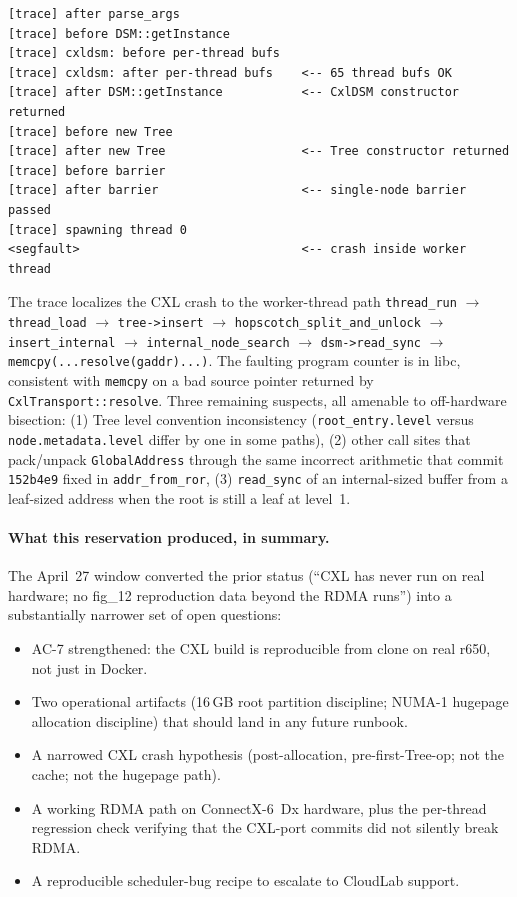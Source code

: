 \documentclass[11pt,a4paper]{article}
\begin{document}
\begin{lstlisting}[basicstyle=\ttfamily\scriptsize]
[trace] after parse_args
[trace] before DSM::getInstance
[trace] cxldsm: before per-thread bufs
[trace] cxldsm: after per-thread bufs    <-- 65 thread bufs OK
[trace] after DSM::getInstance           <-- CxlDSM constructor returned
[trace] before new Tree
[trace] after new Tree                   <-- Tree constructor returned
[trace] before barrier
[trace] after barrier                    <-- single-node barrier passed
[trace] spawning thread 0
<segfault>                               <-- crash inside worker thread
\end{lstlisting}

The trace localizes the CXL crash to the worker-thread path \texttt{thread\_run} $\to$ \texttt{thread\_load} $\to$ \texttt{tree->insert} $\to$ \texttt{hopscotch\_split\_and\_unlock} $\to$ \texttt{insert\_internal} $\to$ \texttt{internal\_node\_search} $\to$ \texttt{dsm->read\_sync} $\to$ \texttt{memcpy(...resolve(gaddr)...)}. The faulting program counter is in libc, consistent with \texttt{memcpy} on a bad source pointer returned by \texttt{CxlTransport::resolve}. Three remaining suspects, all amenable to off-hardware bisection: (1) Tree level convention inconsistency (\texttt{root\_entry.level} versus \texttt{node.metadata.level} differ by one in some paths), (2) other call sites that pack/unpack \texttt{GlobalAddress} through the same incorrect arithmetic that commit \texttt{152b4e9} fixed in \texttt{addr\_from\_ror}, (3) \texttt{read\_sync} of an internal-sized buffer from a leaf-sized address when the root is still a leaf at level~1.

\paragraph{What this reservation produced, in summary.} The April~27 window converted the prior status (``CXL has never run on real hardware; no fig\_12 reproduction data beyond the RDMA runs'') into a substantially narrower set of open questions:

\begin{itemize}[nosep]
    \item AC-7 strengthened: the CXL build is reproducible from clone on real r650, not just in Docker.
    \item Two operational artifacts (16\,GB root partition discipline; NUMA-1 hugepage allocation discipline) that should land in any future runbook.
    \item A narrowed CXL crash hypothesis (post-allocation, pre-first-Tree-op; not the cache; not the hugepage path).
    \item A working RDMA path on ConnectX-6~Dx hardware, plus the per-thread regression check verifying that the CXL-port commits did not silently break RDMA.
    \item A reproducible scheduler-bug recipe to escalate to CloudLab support.
\end{itemize}
\end{document}

